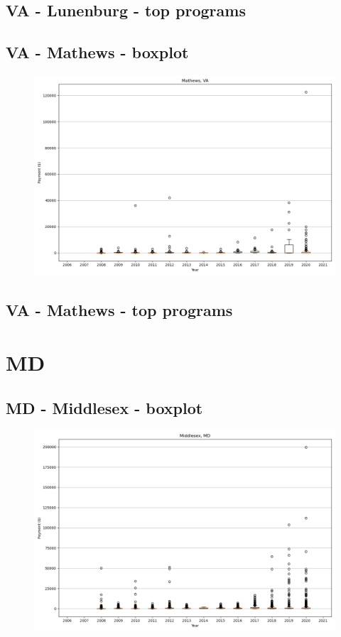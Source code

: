 \subsection*{VA - Lunenburg - top programs}

\newpage
\subsection*{VA - Mathews - boxplot}
\begin{figure}[h]
\centering
\includegraphics[width=7in]{../output/boxplots/counties/Mathews-VA_boxplot.png}
\end{figure}


\subsection*{VA - Mathews - top programs}

\newpage
\section*{MD}
\subsection*{MD - Middlesex - boxplot}
\begin{figure}[h]
\centering
\includegraphics[width=7in]{../output/boxplots/counties/Middlesex-MD_boxplot.png}
\end{figure}


